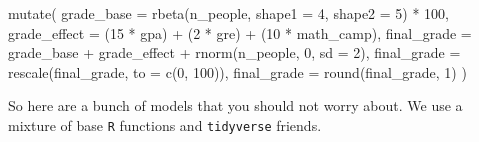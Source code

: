 \documentclass[]{tufte-handout}
\newenvironment{Shaded}{}{}
\newcommand{\AttributeTok}[1]{\textcolor[rgb]{0.49,0.56,0.16}{#1}}
\newcommand{\DecValTok}[1]{\textcolor[rgb]{0.25,0.63,0.44}{#1}}
\newcommand{\FunctionTok}[1]{\textcolor[rgb]{0.02,0.16,0.49}{#1}}
\newcommand{\NormalTok}[1]{#1}
\newcommand{\SpecialCharTok}[1]{\textcolor[rgb]{0.25,0.44,0.63}{#1}}
\begin{document}
\begin{Shaded}
\begin{Highlighting}[]
  \FunctionTok{mutate}\NormalTok{(}
    \AttributeTok{grade\_base =} \FunctionTok{rbeta}\NormalTok{(n\_people, }\AttributeTok{shape1 =} \DecValTok{4}\NormalTok{, }\AttributeTok{shape2 =} \DecValTok{5}\NormalTok{) }\SpecialCharTok{*} \DecValTok{100}\NormalTok{,}
    \AttributeTok{grade\_effect =}\NormalTok{ (}\DecValTok{15} \SpecialCharTok{*}\NormalTok{ gpa) }\SpecialCharTok{+}\NormalTok{ (}\DecValTok{2} \SpecialCharTok{*}\NormalTok{ gre) }\SpecialCharTok{+}\NormalTok{ (}\DecValTok{10} \SpecialCharTok{*}\NormalTok{ math\_camp),}
    \AttributeTok{final\_grade =}\NormalTok{ grade\_base }\SpecialCharTok{+}\NormalTok{ grade\_effect }\SpecialCharTok{+} \FunctionTok{rnorm}\NormalTok{(n\_people, }\DecValTok{0}\NormalTok{, }\AttributeTok{sd =} \DecValTok{2}\NormalTok{),}
    \AttributeTok{final\_grade =} \FunctionTok{rescale}\NormalTok{(final\_grade, }\AttributeTok{to =} \FunctionTok{c}\NormalTok{(}\DecValTok{0}\NormalTok{, }\DecValTok{100}\NormalTok{)),}
    \AttributeTok{final\_grade =} \FunctionTok{round}\NormalTok{(final\_grade, }\DecValTok{1}\NormalTok{)}
\NormalTok{  )}
\end{Highlighting}
\end{Shaded}

So here are a bunch of models that you should not worry about. We use a
mixture of base \texttt{R} functions and \texttt{tidyverse} friends.
\end{document}
